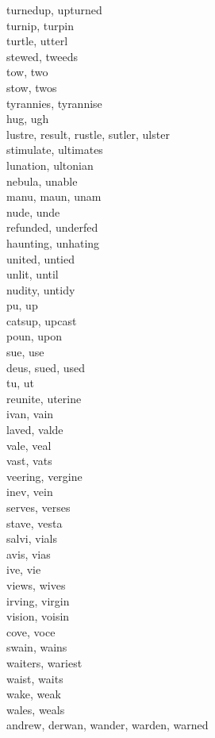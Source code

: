 turnedup, upturned\\
turnip, turpin\\
turtle, utterl\\
stewed, tweeds\\
tow, two\\
stow, twos\\
tyrannies, tyrannise\\
hug, ugh\\
lustre, result, rustle, sutler, ulster\\
stimulate, ultimates\\
lunation, ultonian\\
nebula, unable\\
manu, maun, unam\\
nude, unde\\
refunded, underfed\\
haunting, unhating\\
united, untied\\
unlit, until\\
nudity, untidy\\
pu, up\\
catsup, upcast\\
poun, upon\\
sue, use\\
deus, sued, used\\
tu, ut\\
reunite, uterine\\
ivan, vain\\
laved, valde\\
vale, veal\\
vast, vats\\
veering, vergine\\
inev, vein\\
serves, verses\\
stave, vesta\\
salvi, vials\\
avis, vias\\
ive, vie\\
views, wives\\
irving, virgin\\
vision, voisin\\
cove, voce\\
swain, wains\\
waiters, wariest\\
waist, waits\\
wake, weak\\
wales, weals\\
andrew, derwan, wander, warden, warned\\
